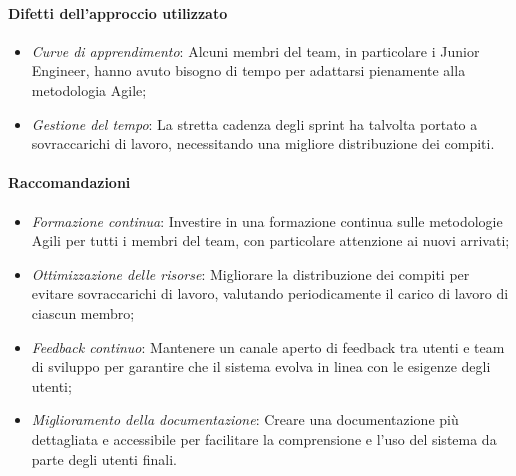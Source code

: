 \documentclass[a4paper,12pt, openright]{report}
\begin{document}
\paragraph{Difetti dell’approccio utilizzato}

\begin{itemize}
    \item \textit{Curve di apprendimento}: Alcuni membri del team, in particolare i Junior Engineer, hanno avuto bisogno di tempo per adattarsi pienamente alla metodologia Agile;
    \item \textit{Gestione del tempo}: La stretta cadenza degli sprint ha talvolta portato a sovraccarichi di lavoro, necessitando una migliore distribuzione dei compiti.
\end{itemize}


\paragraph{Raccomandazioni}

\begin{itemize}
    \item \textit{Formazione continua}: Investire in una formazione continua sulle metodologie Agili per tutti i membri del team, con particolare attenzione ai nuovi arrivati;
    \item \textit{Ottimizzazione delle risorse}: Migliorare la distribuzione dei compiti per evitare sovraccarichi di lavoro, valutando periodicamente il carico di lavoro di ciascun membro;
    \item \textit{Feedback continuo}: Mantenere un canale aperto di feedback tra utenti e team di sviluppo per garantire che il sistema evolva in linea con le esigenze degli utenti;
    \item \textit{Miglioramento della documentazione}: Creare una documentazione più dettagliata e accessibile per facilitare la comprensione e l'uso del sistema da parte degli utenti finali.
\end{itemize}
\end{document}
